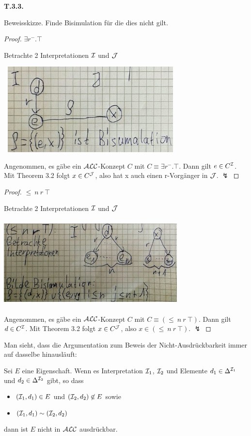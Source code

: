 \textbf{T.3.3.}

Beweisskizze. Finde Bisimulation für die dies nicht gilt.

\begin{proof}
\textbf{$\exists r^{-}.\top$}

Betrachte 2 Interpretationen $\mathcal{I}$ und $\mathcal{J}$

\includegraphics[width=3.71910in,height=1.83200in]{media/33inv.png}

Angenommen, es gäbe ein $\mathcal{A}\mathcal{L}\mathcal{C}$-Konzept $C$ mit $C \equiv \exists r^{-}.\top$. Dann gilt $e \in C^{\mathcal{I}}$. Mit Theorem 3.2 folgt $x \in C^{\mathcal{J}}$, also hat x auch einen r-Vorgänger in $\mathcal{J}$. $\lightning$
\end{proof} 

\begin{proof}
$\leq\ n\ r\ \top$

Betrachte 2 Interpretationen $\mathcal{I}$ und $\mathcal{J}$

\includegraphics[width=3.71910in,height=1.83200in]{media/33low.png}

Angenommen, es gäbe ein $\mathcal{A}\mathcal{L}\mathcal{C}$-Konzept $C$ mit $C \equiv (\leq\ n\ r\ \top)$. Dann gilt $d \in C^{\mathcal{I}}$. Mit Theorem 3.2 folgt $x \in C^{\mathcal{J}}$, also $x \in (\leq\ n\ r\ \top)$. $\lightning$
\end{proof}

Man sieht, dass die Argumentation zum Beweis der Nicht-Ausdrückbarkeit immer auf dasselbe hinausläuft:
\begin{theorem}

Sei $E$ eine Eigenschaft. Wenn es Interpretation $\mathcal{I}_{1}$, $\mathcal{I}_{2}$
und Elemente $d_{1} \in \Delta^{\mathcal{I}_{1}}$ und
$d_{2} \in \Delta^{\mathcal{I}_{2}}$ gibt, so dass

\begin{itemize}
\item
  $\left( \mathcal{I}_{1},d_{1} \right) \in E$ und
  $\left( \mathcal{I}_{2},d_{2} \right) \not\in E$ sowie
\item
  $(\mathcal{I}_{1},d_{1}) \sim (\mathcal{I}_{2},d_{2})$
\end{itemize}

dann ist $E$ nicht in $\mathcal{A}\mathcal{L}\mathcal{C}$ ausdrückbar.
\end{theorem}

